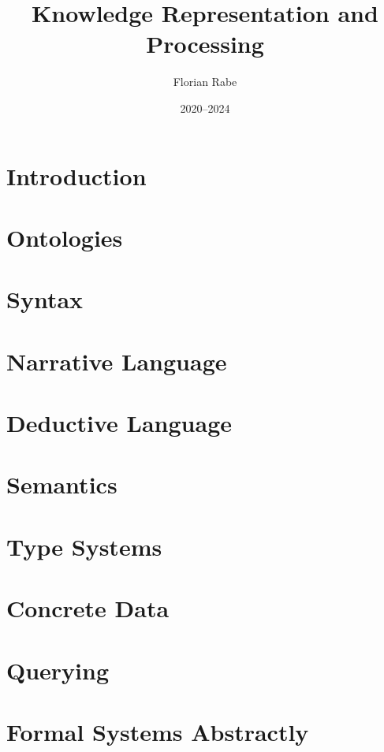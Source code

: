 \documentclass{beamer}
\begin{document}
\title{Knowledge Representation and Processing}
\author{Florian Rabe}
\date{2020--2024}
\begin{frame}
    \titlepage
\end{frame}

\part{Introduction}


\part{Ontologies}


\part{Syntax}


\part{Narrative Language}


\part{Deductive Language}


\part{Semantics}


\part{Type Systems}


\part{Concrete Data}


\part{Querying}


\part{Formal Systems Abstractly}

\end{document}
